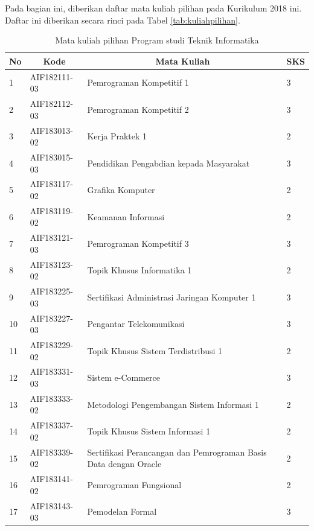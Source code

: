 Pada bagian ini, diberikan daftar mata kuliah pilihan pada Kurikulum 2018 ini. Daftar ini diberikan secara rinci pada Tabel \ref{tab:kuliahpilihan}.

\begin{table}[H]
	\centering
		\caption{Mata kuliah pilihan Program studi Teknik Informatika}
		\begin{tabular}{|p{0.5cm}|p{2.85cm}|p{4.95cm}|p{2.7cm}|}
			\hline
			\multicolumn{1}{|c|}{\textbf{No}} & \multicolumn{1}{c|}{\textbf{Kode}} & \multicolumn{1}{c|}{\textbf{Mata Kuliah}} & \multicolumn{1}{c|}{\textbf{SKS}} \\ \hline
1   & AIF182111-03    & Pemrograman Kompetitif 1   & 3   \\ \hline
2   & AIF182112-03    & Pemrograman Kompetitif 2   & 3   \\ \hline
3   & AIF183013-02    & Kerja Praktek 1                   & 2   \\ \hline
4   & AIF183015-03    & Pendidikan Pengabdian kepada Masyarakat    & 3   \\ \hline
5   & AIF183117-02    & Grafika Komputer                           & 2   \\ \hline
6   & AIF183119-02    & Keamanan Informasi                         & 2   \\ \hline
7   & AIF183121-03    & Pemrograman Kompetitif 3   & 3   \\ \hline
8   & AIF183123-02    & Topik Khusus Informatika 1                 & 2   \\ \hline
9   & AIF183225-03    & Sertifikasi Administrasi Jaringan Komputer 1           & 3   \\ \hline
10   & AIF183227-03    & Pengantar Telekomunikasi                   & 3   \\ \hline
11   & AIF183229-02    & Topik Khusus Sistem Terdistribusi 1        & 2   \\ \hline
12  & AIF183331-03    & Sistem e-Commerce                          & 3   \\ \hline
13  & AIF183333-02    & Metodologi Pengembangan Sistem Informasi 1 & 2   \\ \hline
14  & AIF183337-02    & Topik Khusus Sistem Informasi 1            & 2   \\ \hline
15 & AIF183339-02	& Sertifikasi Perancangan dan Pemrograman Basis Data dengan Oracle & 2 \\ \hline
16 & AIF183141-02   & Pemrograman Fungsional & 2 \\ \hline
17 & AIF183143-03 & Pemodelan Formal                             & 3 \\ \hline

\end{tabular}
\end{table}
